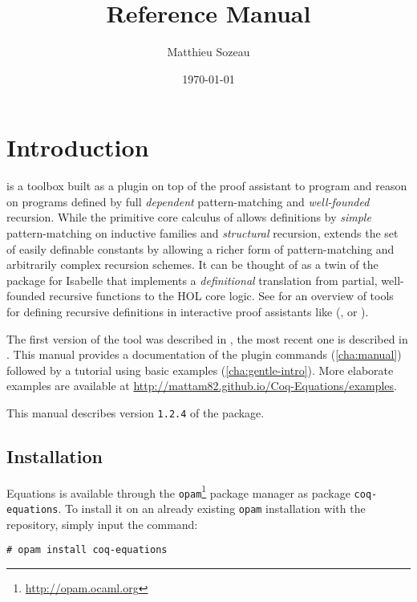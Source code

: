 \documentclass{report}
\author{Matthieu Sozeau}
\date{\today}
\title{\Equations \eqnversion Reference Manual}
\def\eqnversion{\texttt{1.2.4}\xspace}
\begin{document}
\maketitle

\def\coqlibrary#1#2#3{}

\def\Equations{\texorpdfstring{\name{Equations}}{Equations}}

\chapter*{Introduction}
\label{cha:introduction}

\Equations is a toolbox built as a plugin on top of the \Coq proof assistant
to program and reason on programs defined by full \emph{dependent}
pattern-matching and \emph{well-founded} recursion. While the primitive
core calculus of \Coq allows definitions by \emph{simple} pattern-matching on
inductive families and \emph{structural} recursion, \Equations extends
the set of easily definable constants by allowing a richer form of
pattern-matching and arbitrarily complex recursion schemes. It can be
thought of as a twin of the  package for Isabelle that
implements a \emph{definitional} translation from partial, well-founded
recursive functions to the HOL core logic. See
\cite{BoveKraussSozeau2011} for an overview of tools for defining
recursive definitions in interactive proof assistants like (\Coq, \Agda
or \Isabelle).

The first version of the tool was described in
\cite{sozeau.Coq/Equations/ITP10}, the most recent one is described in
\cite{equationsreloaded}. This manual provides a documentation of the plugin
commands (\autoref{cha:manual}) followed by a tutorial using basic
examples (\autoref{cha:gentle-intro}).  More elaborate examples are
available at \url{http://mattam82.github.io/Coq-Equations/examples}.

This manual describes version \eqnversion of the package.

\section*{Installation}

Equations is available through the
\texttt{opam}\footnote{\url{http://opam.ocaml.org}} package manager as
package \texttt{coq-equations}. To install it on an already existing
\texttt{opam} installation with the \Coq repository, simply input the
command:
\begin{verbatim}
# opam install coq-equations
\end{verbatim}
\end{document}
